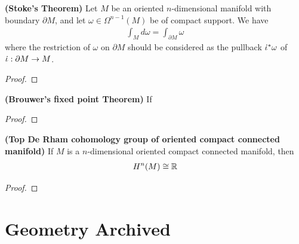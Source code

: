 \documentclass{report}
\begin{document}
\begin{theorem}
\textbf{(Stoke's Theorem)} Let $M$ be an oriented  $n$-dimensional manifold with  boundary $\partial M$, and let $\omega \in \Omega^{n-1}(M)$ be of compact support. We have 
\begin{align*}
\int_M d\omega = \int_{\partial M} \omega 
\end{align*}
where the restriction of $\omega$ on $\partial M$ should be considered as the pullback $\dot{\iota}^*\omega $ of $\dot{\iota}: \partial M\rightarrow M $. 
\end{theorem}
\begin{proof}

\end{proof}
\begin{theorem}
\textbf{(Brouwer's fixed point Theorem)} If 
\end{theorem}
\begin{proof}

\end{proof}
\begin{theorem}
\textbf{(Top De Rham cohomology group of oriented compact connected manifold)} If $M$ is a $n$-dimensional oriented compact connected manifold, then 
 \begin{align*}
H^n(M)\cong  \mathbb{R}
\end{align*}
\end{theorem}
\begin{proof}

\end{proof}
\chapter{Geometry Archived}
\end{document}

